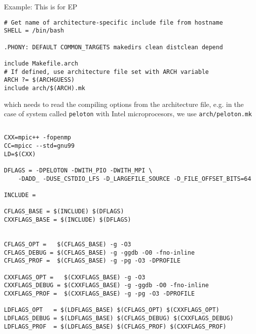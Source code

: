 Example: This is for EP
{\small \begin{verbatim}
# Get name of architecture-specific include file from hostname
SHELL = /bin/bash

.PHONY: DEFAULT COMMON_TARGETS makedirs clean distclean depend

include Makefile.arch
# If defined, use architecture file set with ARCH variable
ARCH ?= $(ARCHGUESS)
include arch/$(ARCH).mk
\end{verbatim}}
which needs to read the compiling options from the architecture file, e.g. in
the case of system called \verb!peloton! with Intel microprocesors, we use
\verb!arch/peloton.mk!
\begin{verbatim}

CXX=mpic++ -fopenmp
CC=mpicc --std=gnu99 
LD=$(CXX)

DFLAGS = -DPELOTON -DWITH_PIO -DWITH_MPI \
    -DADD_ -DUSE_CSTDIO_LFS -D_LARGEFILE_SOURCE -D_FILE_OFFSET_BITS=64

INCLUDE =

CFLAGS_BASE = $(INCLUDE) $(DFLAGS)
CXXFLAGS_BASE = $(INCLUDE) $(DFLAGS)


CFLAGS_OPT =   $(CFLAGS_BASE) -g -O3
CFLAGS_DEBUG = $(CFLAGS_BASE) -g -ggdb -O0 -fno-inline
CFLAGS_PROF =  $(CFLAGS_BASE) -g -pg -O3 -DPROFILE

CXXFLAGS_OPT =   $(CXXFLAGS_BASE) -g -O3
CXXFLAGS_DEBUG = $(CXXFLAGS_BASE) -g -ggdb -O0 -fno-inline
CXXFLAGS_PROF =  $(CXXFLAGS_BASE) -g -pg -O3 -DPROFILE

LDFLAGS_OPT   = $(LDFLAGS_BASE) $(CFLAGS_OPT) $(CXXFLAGS_OPT)
LDFLAGS_DEBUG = $(LDFLAGS_BASE) $(CFLAGS_DEBUG) $(CXXFLAGS_DEBUG)
LDFLAGS_PROF  = $(LDFLAGS_BASE) $(CFLAGS_PROF) $(CXXFLAGS_PROF)
\end{verbatim} 

